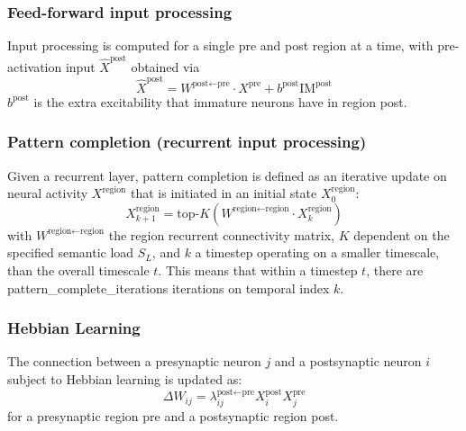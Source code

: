 \documentclass{article}
\begin{document}
\subsubsection*{Feed-forward input processing}
Input processing is computed for a single pre and post region at a time, with pre-activation input $\hat{X}^\textrm{post}$ obtained via
\begin{equation}
    \hat{X}^\textrm{post} = W^{\textrm{post}\leftarrow\textrm{pre}} \cdot X^\textrm{pre} + b^\textrm{post}\textrm{IM}^\textrm{post}
\end{equation}
$b^\textrm{post}$ is the extra excitability that immature neurons have in region post.
\subsubsection*{Pattern completion (recurrent input processing)}
Given a recurrent layer, pattern completion is defined as an iterative update on neural activity $X^\textrm{region}$ that is initiated in an initial state $X^\textrm{region}_0$:
\begin{equation}
    X^{\textrm{region}}_{k+1} = \textrm{top-}K(W^{\textrm{region}\leftarrow\textrm{region}}\cdot X^\textrm{region}_{k})
\end{equation}
with $W^{\textrm{region}\leftarrow\textrm{region}}$ the region recurrent connectivity matrix, $K$ dependent on the specified semantic load $S_L$, and $k$ a timestep operating on a smaller timescale,  than the overall timescale $t$. This means that within a timestep $t$, there are pattern\_complete\_iterations iterations on temporal index $k$.
\subsubsection*{Hebbian Learning}
The connection between a presynaptic neuron $j$ and a postsynaptic neuron $i$ subject to Hebbian learning is updated as:
\begin{equation}
            \Delta W_{ij} = \lambda_{ij}^{\textrm{post} \leftarrow \textrm{pre}}
            X_i^\textrm{post} X_j^\textrm{pre}
\end{equation}
for a presynaptic region pre and a postsynaptic region post.
\end{document}
